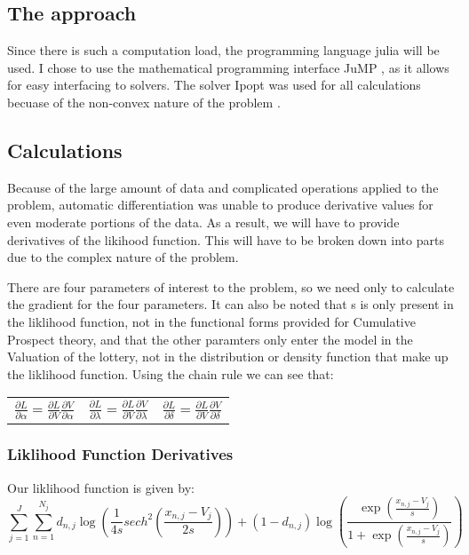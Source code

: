 \documentclass[11pt]{article}
\begin{document}
\subsection{The approach}
\label{sec-4-2}
Since there is such a computation load, the programming language julia
will be used. I chose to use the mathematical programming interface
JuMP \cite{jump}, as it allows for easy interfacing to solvers. The
solver Ipopt was used for all calculations becuase of the non-convex
nature of the problem \cite{ipopt}. 

\subsection{Calculations}
\label{sec-4-3}
Because of the large amount of data and complicated operations applied
to the problem, automatic differentiation was unable to produce
derivative values for even moderate portions of the data. As a result,
we will have to provide derivatives of the likihood function. This
will have to be broken down into parts due to the complex nature of
the problem. 

There are four parameters of interest to the problem, so we need only
to calculate the gradient for the four parameters. It can also be
noted that s is only present in the liklihood function, not in the
functional forms provided for Cumulative Prospect theory, and that the
other paramters only enter the model in the Valuation of the lottery,
not in the distribution or density function that make up the liklihood
function. Using the chain rule we can see that: 
\begin{center}
\begin{tabular}{lll}
$\frac{\partial L}{\partial \alpha} = \frac{ \partial L }{ \partial V} \frac{\partial V}{\partial \alpha}$ & $\frac{\partial L}{\partial \lambda} = \frac{ \partial L }{ \partial V} \frac{\partial V}{\partial \lambda}$ & $\frac{\partial L}{\partial \delta} = \frac{ \partial L }{ \partial V} \frac{\partial V}{\partial \delta}$\\
\end{tabular}
\end{center}

\subsubsection{Liklihood Function Derivatives}
\label{sec-4-3-1}

Our liklihood function is given by:
$$\sum_{j=1}^J \sum_{n=1}^{N_j} d_{n,j} \log( \frac{1}{4s} sech^2 ( \frac{x_{n,j} - V_j}{2s} ) ) + (1-d_{n,j}) \log ( \frac{\exp(\frac{x_{n,j} - V_j}{s})}{1+\exp(\frac{x_{n,j} - V_j}{s})} )$$
\end{document}
